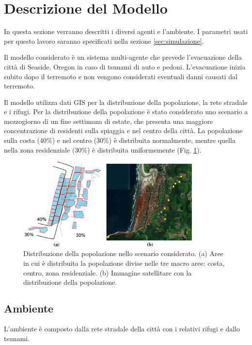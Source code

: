 \section{Descrizione del Modello}
\label{sec:modello}
In questa sezione verranno descritti i diversi agenti e l'ambiente.
I parametri usati per questo lavoro saranno specificati nella sezione \ref{sec:simulazione}.

Il modello considerato \parencite{mostafizi2019agent} è un sistema multi-agente che prevede l'evacuazione della città di Seaside, Oregon in caso di tsunami di auto e pedoni.
%
L'evacuazione inizia subito dopo il terremoto e non vengono considerati eventuali danni causati dal terremoto.

Il modello utilizza dati GIS per la distribuzione della popolazione, la rete stradale e i rifugi.
%
Per la distribuzione della popolazione è stato considerato uno scenario a mezzogiorno di un fine settimana di estate,
che presenta una maggiore concentrazione di residenti sulla spiaggia e nel centro della città.
La popolazione sulla costa (40\%) e nel centro (30\%) è distribuita normalmente,
mentre quella nella zona residenziale (30\%) è distribuita uniformemente (Fig. \ref{fig:population}).

\begin{figure}[ht]
  \centering
  \includegraphics[width=0.82\textwidth]{images/population}
  \caption{Distribuzione della popolazione nello scenario considerato.
    (a) Aree in cui è distribuita la popolazione divise nelle tre macro aree: costa, centro, zona residenziale.
    (b) Immagine satellitare con la distribuzione della popolazione.}
  \label{fig:population}
\end{figure}

\subsection{Ambiente}
L'ambiente è composto dalla rete stradale della città con i relativi rifugi e dallo tsunami.

